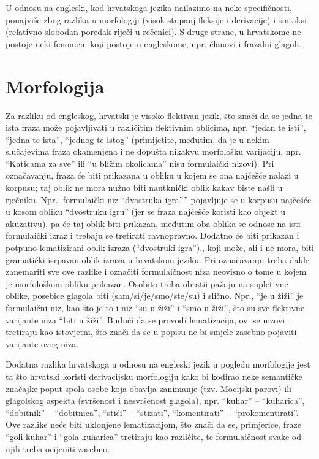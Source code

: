 \documentclass[12pt]{article}
\begin{document}
U odnosu na engleski, kod hrvatskoga jezika nailazimo na neke specifičnosti, ponajviše zbog razlika u
morfologiji (visok stupanj fleksije i derivacije) i sintaksi (relativno slobodan poredak riječi u rečenici). S
druge strane, u hrvatskome ne postoje neki fenomeni koji postoje u engleskome, npr. članovi i frazalni
glagoli.


\section*{Morfologija}

Za razliku od engleskog, hrvatski je visoko flektivan jezik, što znači da se jedna te ista fraza može
pojavljivati u različitim flektivnim oblicima, npr. ``jedan te isti'', ``jedna te ista'', ``jednog te istog'' (primijetite, međutim, da je u nekim slučajevima fraza okamenjena i ne dopušta nikakvu morfološku
varijaciju, npr.  ``Katicama za sve'' ili ``u bližim okolicama'' nisu formulaički nizovi). Pri označavanju, fraza će
biti prikazana u obliku u kojem se ona najčešće nalazi u korpusu; taj oblik ne mora nužno biti nautknički
oblik kakav biste našli u rječniku. Npr., formulaički niz ``dvostruka igra'''' pojavljuje se u korpusu najčešće u
kosom obliku  ``dvostruku igru''  (jer se fraza najčešće koristi kao objekt u akuzativu), pa će taj oblik biti
prikazan, međutim oba oblika se odnose na isti formulaički izraz i trebaju se tretirati ravnopravno. Dodatno
će biti prikazan i potpuno lematizirani oblik izraza (``dvostruki igra''),, koji može, ali i ne mora, biti
gramatički isrpavan oblik izraza u hrvatskom jeziku. Pri označavanju treba dakle zanemariti sve ove razlike
i označiti formulaičnost niza neovisno o tome u kojem je morfološkom obliku prikazan. Osobito treba obratii
pažnju na supletivne oblike, posebice glagola biti (sam/si/je/smo/ste/su) i slično. Npr.,  ``je u žiži'' je
formulaični niz, kao što je to i niz ``su u žiži'' i ``smo u žiži'', što su sve flektivne varijante niza ``biti u žiži''.
Budući da se provodi lematizacija, ovi se nizovi tretiraju kao istovjetni, što znači da se u popisu ne bi smjele
zasebno pojaviti varijante ovog niza.



Dodatna razlika hrvatskoga u odnosu na engleski jezik u pogledu morfologije jest ta što hrvatski koristi
derivacijsku morfologiju kako bi kodirao neke semantičke značajke poput spola osobe koja obavlja
zanimanje (tzv. Mocijski parovi) ili glagolskog aspekta (svršenost i nesvršenost glagola), npr. ``kuhar'' –
``kuharica'', ``dobitnik'' – ``dobitnica'', ``stići'' – ``stizati'', ``komentirati'' – ``prokomentirati''.  Ove razlike neće biti
uklonjene lematizacijom, što znači da se, primjerice, fraze ``goli kuhar'' i ``gola kuharica'' tretiraju kao
različite, te formulaičnost svake od njih treba ocijeniti zasebno.
\end{document}
